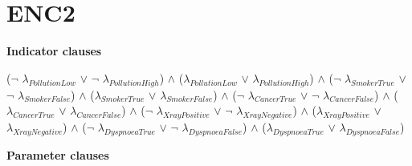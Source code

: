 \section{ENC2}
\label{ENC2}
\textbf{Indicator clauses}\\
\begin{center}
	($\neg$ $\lambda_{PollutionLow}$ $\lor$ $\neg$ $\lambda_{PollutionHigh}$) $\land$ 
($\lambda_{PollutionLow}$ $\lor$ $\lambda_{PollutionHigh}$) $\land$ 
($\neg$ $\lambda_{SmokerTrue}$ $\lor$ $\neg$ $\lambda_{SmokerFalse}$) $\land$ 
($\lambda_{SmokerTrue}$ $\lor$ $\lambda_{SmokerFalse}$) $\land$ 
($\neg$ $\lambda_{CancerTrue}$ $\lor$ $\neg$ $\lambda_{CancerFalse}$) $\land$ 
($\lambda_{CancerTrue}$ $\lor$ $\lambda_{CancerFalse}$) $\land$ 
($\neg$ $\lambda_{XrayPositive}$ $\lor$ $\neg$ $\lambda_{XrayNegative}$) $\land$ 
($\lambda_{XrayPositive}$ $\lor$ $\lambda_{XrayNegative}$) $\land$ 
($\neg$ $\lambda_{DyspnoeaTrue}$ $\lor$ $\neg$ $\lambda_{DyspnoeaFalse}$) $\land$ 
($\lambda_{DyspnoeaTrue}$ $\lor$ $\lambda_{DyspnoeaFalse}$)
\end{center}
\textbf{Parameter clauses}
